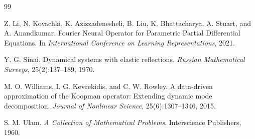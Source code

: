 \documentclass[11pt]{article}
\begin{document}
\begin{thebibliography}{99}

Z. Li, N. Kovachki, K. Azizzadenesheli, B. Liu, K. Bhattacharya, A. Stuart, and A. Anandkumar.
\newblock Fourier Neural Operator for Parametric Partial Differential Equations.
\newblock In \textit{International Conference on Learning Representations}, 2021.

Y. G. Sinai.
\newblock Dynamical systems with elastic reflections.
\newblock \textit{Russian Mathematical Surveys}, 25(2):137--189, 1970.

M. O. Williams, I. G. Kevrekidis, and C. W. Rowley.
\newblock A data-driven approximation of the Koopman operator: Extending dynamic mode decomposition.
\newblock \textit{Journal of Nonlinear Science}, 25(6):1307--1346, 2015.

S. M. Ulam.
\newblock \textit{A Collection of Mathematical Problems}.
\newblock Interscience Publishers, 1960.

\end{thebibliography}
\end{document}
